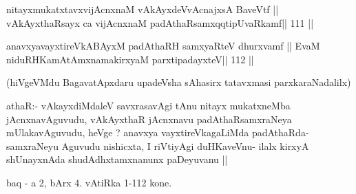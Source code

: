 \begin{shl}
nitayxmukatxtavxvijAcnxnaM  \footnotemark[1]vAkAyxdeVvAcnajxsA BaveVtf ||
vAkAyxthaRsayx ca vijAcnxnaM padAthaRsamxqqtipUvaRkamf\hfill || 111 ||
\end{shl}

\begin{shl}
anavxyavayxtireVkABAyxM padAthaRH samxyaRteV dhurxvamf ||
EvaM niduRHKamAtAmxnamakirxyaM parxtipadayxteV\hfill || 112 ||
\end{shl}

\begin{artha}
(hiVgeVMdu BagavatApxdaru upadeVsha sAhasirx tatavxmasi
  parxkaraNadalilx) 
\end{artha}

\begin{artha}
athaR:- vAkayxdiMdaleV savxrasavAgi tAnu nitayx mukatxneMba
jAcnxnavAguvudu, vAkAyxthaR jAcnxnavu padAthaRsamxraNeya
mUlakavAguvudu, heVge ? anavxya vayxtireVkagaLiMda
padAthaRda-samxraNeyu Aguvudu nishicxta, I riVtiyAgi duHKaveVnu- ilalx
kirxyA shUnayxnAda shudAdhxtamxnanunx paDeyuvanu ||
\end{artha}


\begin{center}
baq - a 2, bArx 4. vAtiRka 1-112 kone.
\end{center}

